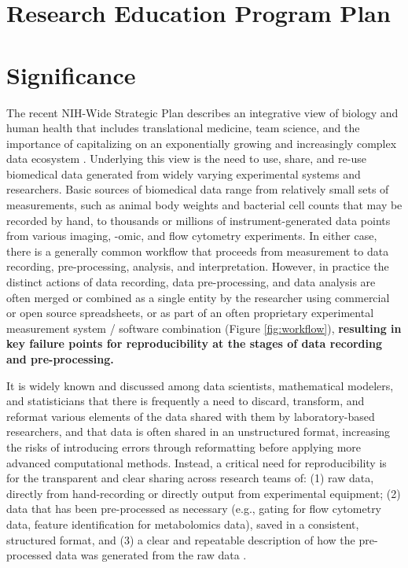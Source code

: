 \documentclass[pdftex,english,11.5pt,parskip=half]{scrartcl}
\begin{document}
\def\bf{\normalfont\bfseries}
\pagestyle{empty}

\section*{Research Education Program Plan}

\section{Significance}
\vspace{-0.1in}

The recent NIH-Wide Strategic Plan \cite{nih2016strategic} describes an
integrative view of biology and human health that includes translational
medicine, team science, and the importance of capitalizing on an exponentially 
growing and increasingly complex data ecosystem \cite{nih2018data}.  Underlying 
this view is the need to use, share, and re-use biomedical data generated from widely 
varying experimental systems and researchers. Basic sources of biomedical data range 
from relatively small sets of measurements, such as animal body weights and bacterial 
cell counts that may be recorded by hand, to thousands or millions of instrument-generated 
data points from various imaging, -omic, and flow cytometry experiments. In either case, 
there is a generally common workflow that proceeds 
from measurement to data recording, pre-processing, analysis, and interpretation.  However, in practice the distinct actions of data recording, data pre-processing, and data analysis 
are often merged or combined as a single entity by the researcher using commercial or open 
source spreadsheets, or as part of an often proprietary experimental measurement 
system / software combination (Figure \ref*{fig:workflow}), \textbf{resulting in key failure points for reproducibility at the stages of data recording and pre-processing.}  

It is widely 
known and discussed among data scientists, mathematical modelers, and statisticians 
\cite{broman2018data, krishnan2016towards} that there is frequently a need to discard, 
transform, and reformat various elements of the data shared with them by laboratory-based researchers, and that data is often shared in an unstructured format, increasing the risks of introducing errors through reformatting before applying more advanced computational methods. Instead, a critical need for reproducibility is for the transparent and clear sharing across research teams of: (1) raw data, directly from hand-recording or directly output from experimental equipment; (2) data that has been pre-processed as necessary (e.g., gating for flow cytometry data, feature identification for metabolomics data), saved in a consistent, structured format, and (3) a clear and repeatable description of how the pre-processed data was generated from the raw data \cite{broman2018data, ellis2018share}.
\end{document}
